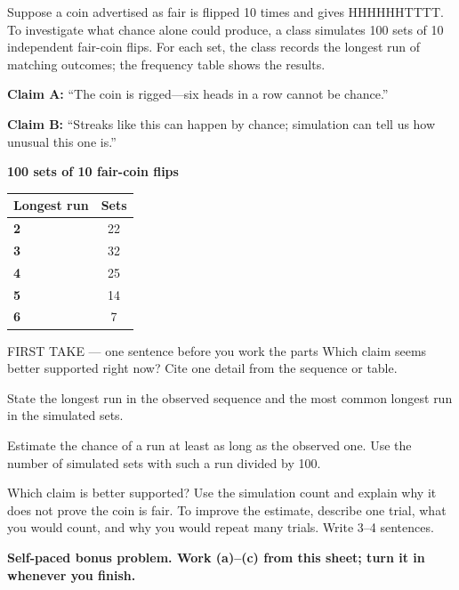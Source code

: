 \documentclass[14pt]{extarticle}
\begin{document}
\pagestyle{empty}


\noindent\begin{minipage}[t]{0.57\linewidth}
\vspace{0pt}
Suppose a coin advertised as fair is flipped 10 times and gives HHHHHHTTTT. To investigate what chance alone could produce, a class simulates 100 sets of 10 independent fair-coin flips. For each set, the class records the longest run of matching outcomes; the frequency table shows the results.\par\smallskip \textbf{Claim A:} ``The coin is rigged---six heads in a row cannot be chance.''\par \textbf{Claim B:} ``Streaks like this can happen by chance; simulation can tell us how unusual this one is.''\par
\end{minipage}\hfill
\begin{minipage}[t]{0.40\linewidth}
\vspace{0pt}
\begin{center}
\textbf{100 sets of 10 fair-coin flips}\par\smallskip
\begin{tabular}{|l|c|}
\hline
\textbf{Longest run} & \textbf{Sets} \\ \hline
\textbf{2} & 22 \\ \hline
\textbf{3} & 32 \\ \hline
\textbf{4} & 25 \\ \hline
\textbf{5} & 14 \\ \hline
\textbf{6} & 7 \\ \hline
\end{tabular}
\end{center}
\end{minipage}

\begin{firsttakebox}{FIRST TAKE --- one sentence before you work the parts}
Which claim seems better supported right now? Cite one detail from the sequence or table.
\end{firsttakebox}

\begin{description}[leftmargin=1.15in, labelwidth=1in, itemsep=2pt, topsep=2pt]
  \item[\dokbadge{1}~(a)] State the longest run in the observed sequence and the most common longest run in the simulated sets.
  \item[\dokbadge{2}~(b)] Estimate the chance of a run at least as long as the observed one. Use the number of simulated sets with such a run divided by 100.
  \item[\dokbadge{3}~(c)] Which claim is better supported? Use the simulation count and explain why it does not prove the coin is fair. To improve the estimate, describe one trial, what you would count, and why you would repeat many trials. Write 3--4 sentences.
\end{description}

\vfill
\textbf{Self-paced bonus problem. Work (a)--(c) from this sheet; turn it in whenever you finish.}
\end{document}
